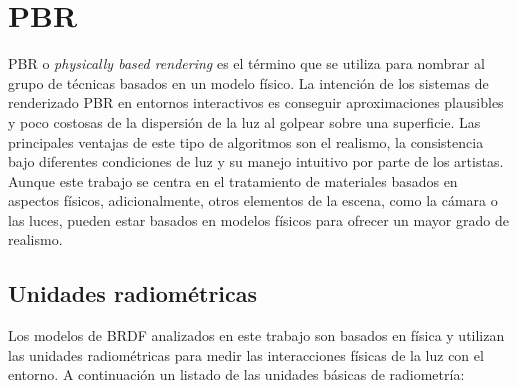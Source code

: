\chapter{PBR}
PBR o \textit{physically based rendering} es el t\'ermino que se utiliza para nombrar al grupo de t\'ecnicas basados en un
modelo f\'isico. La intenci\'on de los sistemas de renderizado PBR en entornos interactivos es conseguir aproximaciones plausibles
y poco costosas de la dispersi\'on de la luz al golpear sobre una superficie. Las principales ventajas de este tipo de algoritmos
son el realismo, la consistencia bajo diferentes condiciones de luz y su manejo intuitivo por parte de los artistas.\\


Aunque este trabajo se centra en el tratamiento de materiales basados en aspectos f\'isicos, adicionalmente, otros elementos
de la escena, como la c\'amara o las luces, pueden estar basados en modelos f\'isicos para ofrecer un mayor grado de realismo.

\section{Unidades radiom\'etricas}
    Los modelos de BRDF analizados en este trabajo son basados en f\'isica y utilizan las unidades radiom\'etricas para
    medir las interacciones f\'isicas de la luz con el entorno. A continuaci\'on un listado de las unidades
    b\'asicas de radiometr\'ia:

